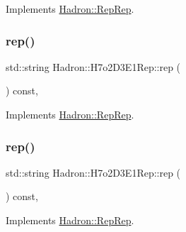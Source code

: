 Implements \mbox{\hyperlink{structHadron_1_1RepRep_ab3213025f6de249f7095892109575fde}{Hadron\+::\+Rep\+Rep}}.

\mbox{\label{structHadron_1_1H7o2D3E1Rep_a9b7fbb0d47650cdab86b3bb9832bbe75}} 
\subsubsection{\texorpdfstring{rep()}{rep()}\hspace{0.1cm}{\footnotesize\ttfamily [2/5]}}
{\footnotesize\ttfamily std\+::string Hadron\+::\+H7o2\+D3\+E1\+Rep\+::rep (\begin{DoxyParamCaption}{ }\end{DoxyParamCaption}) const\hspace{0.3cm}{\ttfamily [inline]}, {\ttfamily [virtual]}}



Implements \mbox{\hyperlink{structHadron_1_1RepRep_ab3213025f6de249f7095892109575fde}{Hadron\+::\+Rep\+Rep}}.

\mbox{\label{structHadron_1_1H7o2D3E1Rep_a9b7fbb0d47650cdab86b3bb9832bbe75}} 
\subsubsection{\texorpdfstring{rep()}{rep()}\hspace{0.1cm}{\footnotesize\ttfamily [3/5]}}
{\footnotesize\ttfamily std\+::string Hadron\+::\+H7o2\+D3\+E1\+Rep\+::rep (\begin{DoxyParamCaption}{ }\end{DoxyParamCaption}) const\hspace{0.3cm}{\ttfamily [inline]}, {\ttfamily [virtual]}}



Implements \mbox{\hyperlink{structHadron_1_1RepRep_ab3213025f6de249f7095892109575fde}{Hadron\+::\+Rep\+Rep}}.

\mbox{\label{structHadron_1_1H7o2D3E1Rep_a9b7fbb0d47650cdab86b3bb9832bbe75}} 

